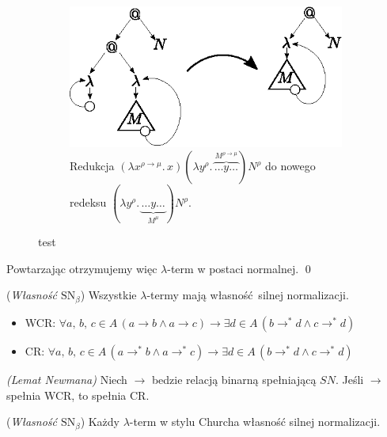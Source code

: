 \begin{dowod}
\begin{figure}[htb]
\end{figure}
\begin{figure}[htb]\ContinuedFloat
  \centering
  \begin{subfigure}{0.55\textwidth}
    \includegraphics[width=1\linewidth]{../reduction3}
    \caption{Redukcja \((\lambda x^{\rho\to\mu}.\,x)(\lambda y^\rho.\,\overbrace{\dots y \dots}^{M^{\rho\to\mu}}) N^\rho\) do nowego redeksu \((\lambda y^\rho.\,\underbrace{\dots y \dots}_{M^\mu})N^\rho\).}
  \end{subfigure}
  \caption{test}
\end{figure}
\clearpage 
  Powtarzając otrzymujemy więc \(\lambda\)-term w postaci normalnej. \qed

\end{dowod}
\begin{twierdzenie} 
  (\emph{Własność \(\mathrm{SN}_{\beta}\)}) Wszystkie \(\lambda\)-termy mają własność silnej normalizacji.
\end{twierdzenie}
\begin{itemize}
\item WCR: \(\forall a,\,b,\,c\in A\, (a\longrightarrow b \land a\longrightarrow c)\to \exists d\in A\,(b\longrightarrow^{*} d \land c\longrightarrow^{*} d)\)
\item CR: \(\forall a,\,b,\,c\in A\, (a\longrightarrow^{*} b \land a\longrightarrow^{*}c)\to \exists d\in A\,(b\longrightarrow^{*} d \land c\longrightarrow^{*} d)\)
\end{itemize}
\begin{twierdzenie} 
  \emph{(Lemat Newmana)} Niech \(\to\) bedzie relacją binarną spełniającą \(SN\). Jeśli \(\to\) spełnia WCR, to spełnia CR.
\end{twierdzenie}
\begin{dowod}
\end{dowod}

\begin{twierdzenie} 
  (\emph{Własność \(\mathrm{SN}_{\beta}\)}) Każdy \(\lambda\)-term w stylu Churcha własność silnej normalizacji.
\end{twierdzenie}
\begin{dowod}
\end{dowod}

